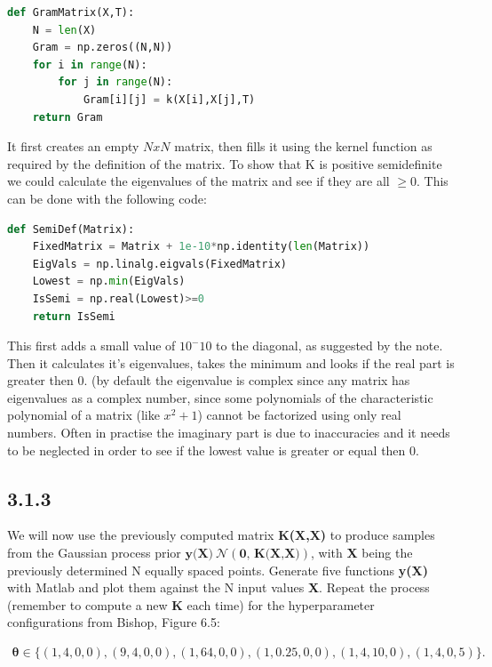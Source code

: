 \documentclass[a4paper]{article}
\begin{document}
\begin{lstlisting}[language=Python]
def GramMatrix(X,T):
    N = len(X)
    Gram = np.zeros((N,N))
    for i in range(N):
        for j in range(N):
            Gram[i][j] = k(X[i],X[j],T)
    return Gram
\end{lstlisting}

It first creates an empty $N x N$ matrix, then fills it using the kernel function as required by the definition of the matrix. To show that K is positive semidefinite we could calculate the eigenvalues of the matrix and see if they are all $\geq 0$. This can be done with the following code:

\begin{lstlisting}[language=Python]
def SemiDef(Matrix):
    FixedMatrix = Matrix + 1e-10*np.identity(len(Matrix))
    EigVals = np.linalg.eigvals(FixedMatrix)
    Lowest = np.min(EigVals)
    IsSemi = np.real(Lowest)>=0
    return IsSemi
\end{lstlisting}

This first adds a small value of $10^-10$ to the diagonal, as suggested by the note. Then it calculates it's eigenvalues, takes the minimum and looks if the real part is greater then 0. (by default the eigenvalue is complex since any matrix has eigenvalues as a complex number, since some polynomials of the characteristic polynomial of a matrix (like $x^2+1$) cannot be factorized using only real numbers. Often in practise the imaginary part is due to inaccuracies and it needs to be neglected in order to see if the lowest value is greater or equal then 0.




\subsection*{3.1.3}

We will now use the previously computed matrix \textbf{K(X,X)} to produce samples from the Gaussian process prior $\textbf{y(X)} ~\mathcal{N}(\textbf{0, K(X,X)})$, with \textbf{X} being the previously determined N equally spaced points. Generate five functions \textbf{y(X)} with Matlab and plot them against the N input values \textbf{X}. Repeat the process (remember to compute a new \textbf{K} each time) for the hyperparameter configurations from Bishop, Figure 6.5:

\begin{align*}
\boldsymbol{\theta} \in \{(1,4,0,0),(9,4,0,0),(1,64,0,0),(1,0.25,0,0),(1,4,10,0),(1,4,0,5)\}.
\end{align*}
\end{document}
